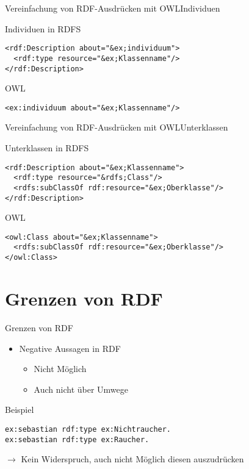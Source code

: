 \documentclass{beamer}
\begin{document}
\begin{frame}[fragile]{Vereinfachung von RDF-Ausdrücken mit
OWL}{Individuen}
\begin{block}{Individuen in RDFS}
\begin{lstlisting}[lang="xml"]
<rdf:Description about="&ex;individuum">
  <rdf:type resource="&ex;Klassenname"/>
</rdf:Description>
\end{lstlisting}
\end{block}
\begin{block}{OWL}
\begin{lstlisting}[lang="xml"]
<ex:individuum about="&ex;Klassenname"/>
\end{lstlisting}
\end{block}
\end{frame}

\begin{frame}[fragile]{Vereinfachung von RDF-Ausdrücken mit
OWL}{Unterklassen}
\begin{block}{Unterklassen in RDFS}
\begin{lstlisting}[lang="xml"]
<rdf:Description about="&ex;Klassenname">
  <rdf:type resource="&rdfs;Class"/>
  <rdfs:subClassOf rdf:resource="&ex;Oberklasse"/>
</rdf:Description>
\end{lstlisting}
\end{block}
\begin{block}{OWL}
\begin{lstlisting}[lang="xml"]
<owl:Class about="&ex;Klassenname">
  <rdfs:subClassOf rdf:resource="&ex;Oberklasse"/>
</owl:Class>
\end{lstlisting}
\end{block}

\end{frame}




\section{Grenzen von RDF}

\begin{frame}[fragile]{Grenzen von RDF}
\begin{itemize}
\item Negative Aussagen in RDF
\begin{itemize}
\item Nicht Möglich
\item Auch nicht über Umwege
\end{itemize}
\end{itemize}
\begin{exampleblock}{Beispiel}
\begin{lstlisting}
ex:sebastian rdf:type ex:Nichtraucher.
ex:sebastian rdf:type ex:Raucher.
\end{lstlisting}
$\rightarrow$ Kein Widerspruch, auch nicht Möglich diesen auszudrücken
\end{exampleblock}
\end{frame}
\end{document}
